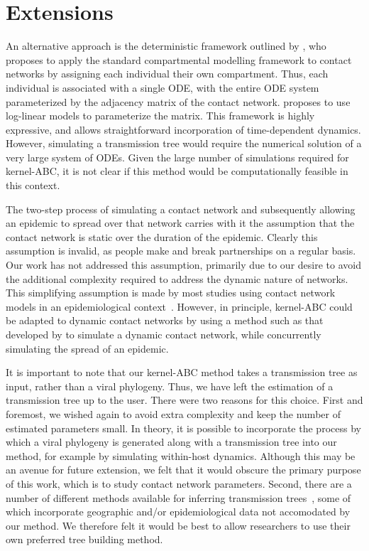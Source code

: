 \section{Extensions}


An alternative approach is the deterministic framework outlined by
\textcite{morris1993epidemiology}, who proposes to apply the standard
compartmental modelling framework to contact networks by assigning each
individual their own compartment. Thus, each individual is associated with a
single \gls{ODE}, with the entire \gls{ODE} system parameterized by the
adjacency matrix of the contact network. \citeauthor{morris1993epidemiology}
proposes to use log-linear models to parameterize the matrix. This framework is
highly expressive, and allows straightforward incorporation of time-dependent
dynamics. However, simulating a transmission tree would require the numerical
solution of a very large system of \glspl{ODE}. Given the large number of
simulations required for kernel-\gls{ABC}, it is not clear if this method would
be computationally feasible in this context.


The two-step process of simulating a contact network and subsequently allowing
an epidemic to spread over that network carries with it the assumption that the
contact network is static over the duration of the epidemic. Clearly this
assumption is invalid, as people make and break partnerships on a regular
basis. Our work has not addressed this assumption, primarily due to our desire
to avoid the additional complexity required to address the dynamic nature of
networks. This simplifying assumption is made by most studies using contact
network models in an epidemiological context~\autocite{welch2011statistical,
bansal2007individual}. However, in principle, kernel-\gls{ABC} could be
adapted to dynamic contact networks by using a method such as that developed by
\textcite{robinson2012dynamics} to simulate a dynamic contact network, while
concurrently simulating the spread of an epidemic.


It is important to note that our kernel-ABC method takes a transmission tree as
input, rather than a viral phylogeny. Thus, we have left the estimation of a
transmission tree up to the user. There were two reasons for this choice. First
and foremost, we wished again to avoid extra complexity and keep the number of
estimated parameters small. In theory, it is possible to incorporate the
process by which a viral phylogeny is generated along with a transmission tree
into our method, for example by simulating within-host dynamics. Although this
may be an avenue for future extension, we felt that it would obscure the
primary purpose of this work, which is to study contact network parameters.
Second, there are a number of different methods available for inferring
transmission trees~\autocite{didelot2014bayesian, yima2012unravelling,
jombart2011reconstructing, cottam2008integrating, poon2015phylodynamic}, some
of which incorporate geographic and/or epidemiological data not accomodated by
our method. We therefore felt it would be best to allow researchers to use
their own preferred tree building method.
